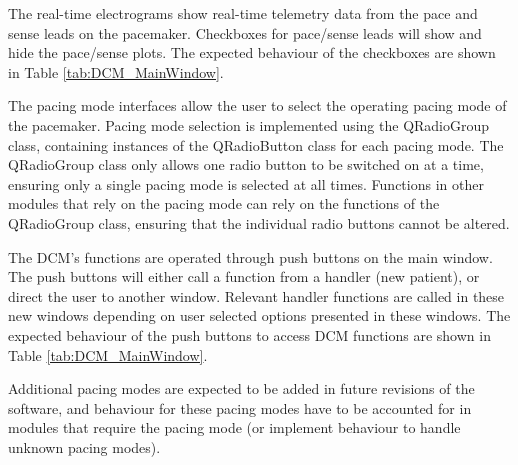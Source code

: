 \documentclass[12pt]{article}
\begin{document}
The real-time electrograms show real-time telemetry data from the pace and sense leads on the pacemaker. Checkboxes for pace/sense leads will show and hide the pace/sense plots. The expected behaviour of the checkboxes are shown in Table \ref{tab:DCM_MainWindow}.

The pacing mode interfaces allow the user to select the operating pacing mode of the pacemaker. Pacing mode selection is implemented using the QRadioGroup class, containing instances of the QRadioButton class for each pacing mode. The QRadioGroup class only allows one radio button to be switched on at a time, ensuring only a single pacing mode is selected at all times. Functions in other modules that rely on the pacing mode can rely on the functions of the QRadioGroup class, ensuring that the individual radio buttons cannot be altered.

The DCM's functions are operated through push buttons on the main window. The push buttons will either call a function from a handler (new patient), or direct the user to another window. Relevant handler functions are called in these new windows depending on user selected options presented in these windows. The expected behaviour of the push buttons to access DCM functions are shown in Table \ref{tab:DCM_MainWindow}.

Additional pacing modes are expected to be added in future revisions of the software, and behaviour for these pacing modes have to be accounted for in modules that require the pacing mode (or implement behaviour to handle unknown pacing modes). 
\end{document}

